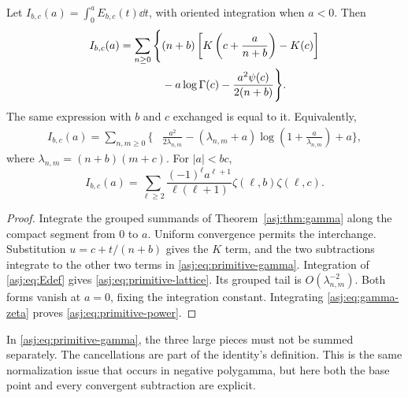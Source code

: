 \begin{theorem}\label{asj:thm:primitive}
Let $I_{b,c}(a)=\int_0^a E_{b,c}(t)\dd t$, with oriented integration
when $a<0$. Then
\begin{align}\label{asj:eq:primitive-gamma}
 I_{b,c}(a)=\sum_{n\ge0}\Bigg\{&(n+b)
              \left[K\left(c+\frac a{n+b}\right)-K(c)\right]\notag\\
              &-a\log\Gamma(c)-\frac{a^2\psi(c)}{2(n+b)}\Bigg\}.
\end{align}
The same expression with $b$ and $c$ exchanged is equal to it. Equivalently,
\begin{align}\label{asj:eq:primitive-lattice}
 I_{b,c}(a)=\sum_{n,m\ge0}\Bigg\{&\frac{a^2}{2\lambda_{n,m}}
        -(\lambda_{n,m}+a)
                 \log\left(1+\frac a{\lambda_{n,m}}\right)+a\Bigg\},
\end{align}
where $\lambda_{n,m}=(n+b)(m+c)$. For $|a|<bc$,
\begin{equation}\label{asj:eq:primitive-power}
 I_{b,c}(a)=\sum_{\ell\ge2}\frac{(-1)^\ell a^{\ell+1}}{\ell(\ell+1)}
                                   \zeta(\ell,b)\zeta(\ell,c).
\end{equation}
\end{theorem}
\begin{proof}
Integrate the grouped summands of Theorem~\ref{asj:thm:gamma} along the
compact segment from $0$ to $a$. Uniform convergence permits the
interchange. Substitution $u=c+t/(n+b)$ gives the $K$ term, and the
two subtractions integrate to the other two terms in
\eqref{asj:eq:primitive-gamma}. Integration of \eqref{asj:eq:Edef} gives
\eqref{asj:eq:primitive-lattice}. Its grouped tail is $O(\lambda_{n,m}^{-2})$.
Both forms vanish at $a=0$, fixing the integration constant. Integrating
\eqref{asj:eq:gamma-zeta} proves \eqref{asj:eq:primitive-power}.
\end{proof}

In \eqref{asj:eq:primitive-gamma}, the three large pieces must not be summed
separately. The cancellations are part of the identity's definition.
This is the same normalization issue that occurs in negative polygamma,
but here both the base point and every convergent subtraction are explicit.
